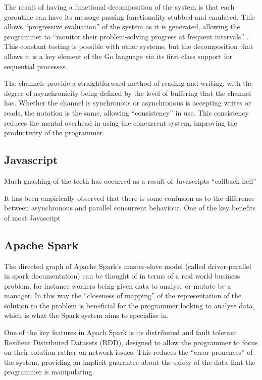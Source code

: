 \documentclass{sig-alternate}
\begin{document}
The result of having a functional decomposition of the system is that each goroutine can have its message passing functionality stubbed and emulated. This allows ``progressive evaluation'' of the system as it is generated, allowing the programmer to ``monitor their problem-solving progress at frequent intervals'' \cite{enpl}. This constant testing is possible with other systems, but the decomposition that allows it is a key element of the Go language via its first class support for sequential processes.

The channels provide a straightforward method of reading and writing, with the degree of asynchronicity being defined by the level of buffering that the channel has. Whether the channel is synchronous or asynchronous is accepting writes or reads, the notation is the same, allowing ``consistency'' in use. This consistency reduces the mental overhead in using the concurrent system, improving the productivity of the programmer.

\subsection{Javascript}


Much gnashing of the teeth has occurred as a result of Javascripts ``callback hell'' \cite{Edwards:2009:CR:1639950.1640058}

It has been empirically observed that there is some confusion as to the difference between asynchronous and parallel concurrent behaviour. One of the key benefits of most Javascript 


\subsection{Apache Spark}
The directed graph of Apache Spark's master-slave model (called driver-parallel in spark documentation) can be thought of in terms of a real world business problem, for instance workers being given data to analyse or mutate by a manager. In this way the ``closeness of mapping'' of the representation of the solution to the problem is beneficial for the programmer looking to analyse data, which is what the Spark system aims to specialise in.

One of the key features in Apach Spark is its distributed and fault tolerant Resilient Distributed Datasets (RDD), designed to allow the programmer to focus on their solution rather on network issues. This reduces the ``error-proneness'' of the system, providing an implicit guarantee about the safety of the data that the programmer is manipulating. 
\end{document}
